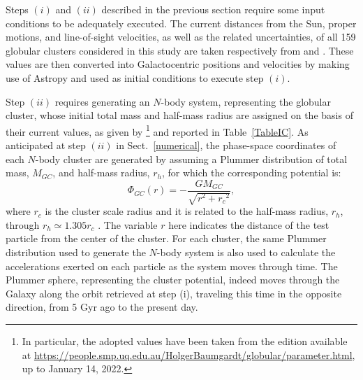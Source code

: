         Steps $(i)$ and $(ii)$ described in the previous section require some input conditions to be adequately executed. The current distances from the Sun, proper motions, and line-of-sight velocities, as well as the related uncertainties, of all 159 globular clusters considered in this study are taken respectively from \citet{2021MNRAS.505.5957B} and \citet{2021MNRAS.505.5978V}. These values are then converted into Galactocentric positions and velocities by making use of Astropy and used as initial conditions to execute step $(i)$. 

        Step $(ii)$ requires generating an $N$-body system, representing the globular cluster, whose initial total mass and half-mass radius are assigned on the basis of their current values, as given by \citet{2018MNRAS.478.1520B}\footnote{In particular, the adopted  values have been taken from the edition available at \url{https://people.smp.uq.edu.au/HolgerBaumgardt/globular/parameter.html}, up to January 14, 2022.} and reported in Table~\ref{TableIC}. As anticipated at step $(ii)$ in Sect.~\ref{numerical}, the phase-space coordinates of each $N$-body cluster are generated by assuming  a Plummer distribution of total mass, $M_{GC}$, and half-mass radius, $r_{h}$, for which the corresponding potential is:
        \begin{equation}\label{gcpot}
            \Phi_{GC}(r) = -\frac{GM_{GC}}{\sqrt{r^2+{r_c}^2}},
            \end{equation}
        where $r_c$ is the cluster scale radius and it is related to the half-mass radius, $r_{h}$, through $r_{h} \simeq 1.305 r_c$ \citep{2003gmbp.book.....H}. The variable $r$ here indicates the distance of the test particle from the center of the cluster. For each cluster, the same Plummer distribution used to generate the $N$-body system is also used to calculate the accelerations exerted on each particle as the system moves through time. The Plummer sphere, representing the cluster potential, indeed moves through the Galaxy along the orbit retrieved at step (i), traveling this time in the opposite direction, from 5 Gyr ago to the present day.

